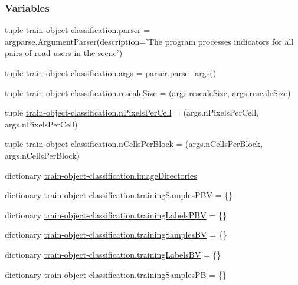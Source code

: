 \subsubsection*{Variables}
\begin{DoxyCompactItemize}
\item 
tuple \hyperlink{namespacetrain-object-classification_a0faae7a7d395697b060e823d04219e0f}{train-\/object-\/classification.\-parser} = argparse.\-Argument\-Parser(description='The program processes indicators for all pairs of road users in the scene')
\item 
tuple \hyperlink{namespacetrain-object-classification_afa7a28d301302f6bd37de924c64b1bdc}{train-\/object-\/classification.\-args} = parser.\-parse\-\_\-args()
\item 
tuple \hyperlink{namespacetrain-object-classification_a7445c2ad53d94011d88eb28e071bf238}{train-\/object-\/classification.\-rescale\-Size} = (args.\-rescale\-Size, args.\-rescale\-Size)
\item 
tuple \hyperlink{namespacetrain-object-classification_a87883a27239630d0a9c47fca467213f7}{train-\/object-\/classification.\-n\-Pixels\-Per\-Cell} = (args.\-n\-Pixels\-Per\-Cell, args.\-n\-Pixels\-Per\-Cell)
\item 
tuple \hyperlink{namespacetrain-object-classification_a5e2d196faf72ea32e18f7ad46a1dc137}{train-\/object-\/classification.\-n\-Cells\-Per\-Block} = (args.\-n\-Cells\-Per\-Block, args.\-n\-Cells\-Per\-Block)
\item 
dictionary \hyperlink{namespacetrain-object-classification_ae0d18afa9685e4a46f18d0d05bdc2b2a}{train-\/object-\/classification.\-image\-Directories}
\item 
dictionary \hyperlink{namespacetrain-object-classification_a7c37289cd9dacd3d8ee80ad55837eef1}{train-\/object-\/classification.\-training\-Samples\-P\-B\-V} = \{\}
\item 
dictionary \hyperlink{namespacetrain-object-classification_aa958fd7d4e72aebaf8bde4baf7069c36}{train-\/object-\/classification.\-training\-Labels\-P\-B\-V} = \{\}
\item 
dictionary \hyperlink{namespacetrain-object-classification_a6762d7395185b12823ca29a8e90ef492}{train-\/object-\/classification.\-training\-Samples\-B\-V} = \{\}
\item 
dictionary \hyperlink{namespacetrain-object-classification_aebca87b0b579e8a4386bb6af75a526c0}{train-\/object-\/classification.\-training\-Labels\-B\-V} = \{\}
\item 
dictionary \hyperlink{namespacetrain-object-classification_aa63e452b413750b1a2b7937339ac1d49}{train-\/object-\/classification.\-training\-Samples\-P\-B} = \{\}

\end{DoxyCompactItemize}
